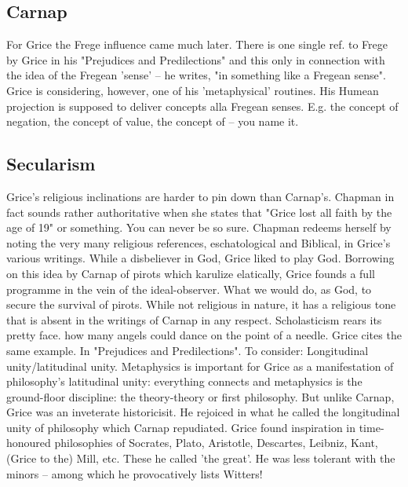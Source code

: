\documentclass[10pt,titlepage]{book}
\begin{document}
{\subsection{Carnap}

For  Grice the Frege influence came much later. There is one single ref. 
to Frege by  Grice in his "Prejudices and Predilections" and this only in 
connection with the  idea of the Fregean 'sense' -- he writes, "in something 
like a Fregean sense".  Grice is considering, however, one of his 
'metaphysical' routines. His Humean  projection is supposed to deliver concepts alla 
Fregean senses. E.g. the concept  of negation, the concept of value, the 
concept of -- you name  it.

\subsection{Secularism}

Grice's religious inclinations are harder to pin down than Carnap’s.
Chapman in  fact sounds rather authoritative when she states that 
"Grice lost all faith by  the age of 19" or something. You can never be so 
sure. Chapman redeems herself  by noting the very many religious references, 
eschatological and Biblical, in  Grice's various writings. While a disbeliever 
in God, Grice liked to play God.  Borrowing on this idea by Carnap of 
pirots which karulize elatically, Grice  founds a full programme in the vein of 
the ideal-observer. What we would do, as  God, to secure the survival of 
pirots. While not religious in nature, it has a  religious tone that is absent 
in the writings of Carnap in any  respect. 
Scholasticism  rears its pretty face. how many angels could dance on the 
point of a needle.  Grice cites the same example. In "Prejudices and 
Predilections". To consider:  Longitudinal unity/latitudinal unity. Metaphysics is 
important for Grice as a  manifestation of philosophy's latitudinal unity: 
everything connects and  metaphysics is the ground-floor discipline: the 
theory-theory or first  philosophy. But unlike Carnap, Grice was an inveterate 
historicisit. He rejoiced  in what he called the longitudinal unity of 
philosophy which Carnap repudiated.  Grice found inspiration in time-honoured 
philosophies of Socrates, Plato,  Aristotle, Descartes, Leibniz, Kant, (Grice to 
the) Mill, etc. These he called  'the great'. He was less tolerant with the 
minors -- among which he  provocatively lists Witters! 

}
\end{document}
